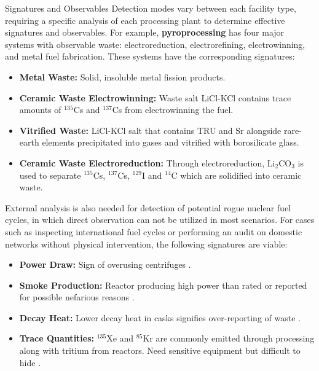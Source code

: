 \documentclass[final]{beamer}
\newlength{\onecolwid}
\newlength{\threecolwid}
\begin{document}
\begin{frame}[t]
\begin{columns}[t,totalwidth=\threecolwid]
\begin{column}{\onecolwid}
\begin{block}{Signatures and Observables}
        Detection modes vary between each facility type, requiring a specific 
        analysis of each processing plant to determine effective signatures and 
        observables. For example, \textbf{pyroprocessing} has four major 
        systems with observable waste: electroreduction, electrorefining, electrowinning, and metal fuel fabrication\cite{Borrelli_2017}.
        These systems have the corresponding signatures:
	
	\begin{itemize}
		\item \textbf{Metal Waste:} Solid, insoluble metal fission products.
		\item \textbf{Ceramic Waste Electrowinning:} Waste salt LiCl-KCl contains trace amounts of $^{135}$Cs and $^{137}$Cs from
		electrowinning the fuel.
		\item \textbf{Vitrified Waste:} LiCl-KCl salt that contains TRU and Sr alongside rare-earth elements precipitated into gases
		and vitrified with borosilicate glass.
		\item \textbf{Ceramic Waste Electroreduction:} Through electroreduction, Li$_2$CO$_3$ is used to separate $^{135}$Cs, $^{137}$Cs, 
		$^{129}$I and $^{14}$C which are solidified into ceramic waste.
	\end{itemize}

		External analysis is also needed for detection of potential rogue nuclear fuel cycles, in which direct observation can not be
		utilized in most scenarios. For cases such as inspecting international fuel cycles or performing an audit on domestic networks
		without physical intervention, the following signatures are viable:
		
	\begin{itemize}
		\item \textbf{Power Draw:} Sign of overusing centrifuges \cite{Yilmaz_2016,Hou_2016}.
		\item \textbf{Smoke Production:} Reactor producing high power than rated or reported for possible
		nefarious reasons \cite{Yilmaz_2016}.
		\item \textbf{Decay Heat:} Lower decay heat in casks signifies over-reporting of waste \cite{Kemp_2016}.
		\item \textbf{Trace Quantities:} $^{135}$Xe and $^{85}$Kr are commonly emitted through processing along with tritium
		from reactors. Need sensitive equipment but difficult to hide \cite{Borrelli_2017,Kemp_2016}.
	\end{itemize}
	

\end{block}
\end{column}
\end{columns}
\end{frame}
\end{document}
